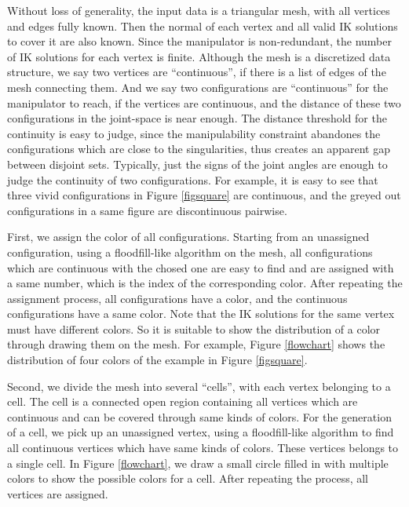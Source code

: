 \documentclass[journal]{IEEEtran}
\begin{document}
Without loss of generality, the input data is a triangular mesh, with all vertices and edges fully known. Then the normal of each vertex and all valid IK solutions to cover it are also known. 
Since the manipulator is non-redundant, the number of IK solutions for each vertex is finite. 
Although the mesh is a discretized data structure, we say two vertices are ``continuous'', if there is a list of edges of the mesh connecting them. And we say two configurations are ``continuous'' for the manipulator to reach, if the vertices are continuous, and the distance of these two configurations in the joint-space is near enough. The distance threshold for the continuity is easy to judge, since the manipulability constraint abandones the configurations which are close to the singularities, thus creates an apparent gap between disjoint sets. Typically, just the signs of the joint angles are enough to judge the continuity of two configurations. For example, it is easy to see that three vivid configurations in Figure \ref{figsquare} are continuous, and the greyed out configurations in a same figure are discontinuous pairwise. 

First, we assign the color of all configurations. Starting from an unassigned configuration, using a floodfill-like algorithm on the mesh, all configurations which are continuous with the chosed one are easy to find and are assigned with a same number, which is the index of the corresponding color. After repeating the assignment process, all configurations have a color, and the continuous configurations have a same color. 
Note that the IK solutions for the same vertex must have different colors. 
So it is suitable to show the distribution of a color through drawing them on the mesh. For example, Figure \ref{flowchart} shows the distribution of four colors of the example in Figure \ref{figsquare}.

Second, we divide the mesh into several ``cells'', with each vertex belonging to a cell. The cell is a connected open region containing all vertices which are continuous and can be covered through same kinds of colors. 
For the generation of a cell, we pick up an unassigned vertex, using a floodfill-like algorithm to find all continuous vertices which have same kinds of colors. 
These vertices belongs to a single cell. In Figure \ref{flowchart}, we draw a small circle filled in with multiple colors to show the possible colors for a cell. After repeating the process, all vertices are assigned. 
\end{document}
